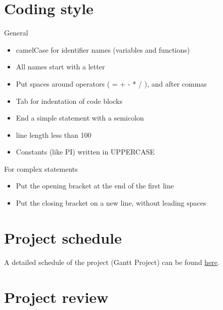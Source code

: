 \documentclass[12pt,fleqn]{article}
\begin{document}
\section *{Coding style}
General
\begin{itemize}
    \item camelCase for identifier names (variables and functions)
    \item All names start with a letter
    \item Put spaces around operators ( = + - * / ), and after commas
    \item Tab for indentation of code blocks
    \item End a simple statement with a semicolon
    \item line length less than 100
    \item Constants (like PI) written in UPPERCASE
\end{itemize}
\newline
\noindent For complex statements
\begin{itemize}
    \item Put the opening bracket at the end of the first line
    \item Put the closing bracket on a new line, without leading spaces

\end{itemize}

\section *{Project schedule}
A detailed schedule of the project (Gantt Project) can be found \href{https://gitlab.cas.mcmaster.ca/guirguia/3XA3_Project/blob/master/ProjectSchedule/3xa3.gan}{here}.

\section *{Project review}
\end{document}
